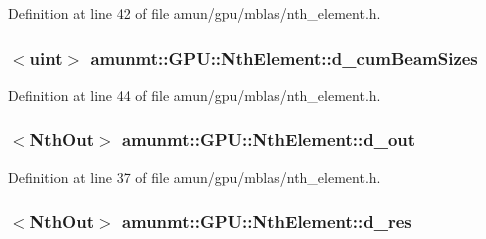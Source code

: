 Definition at line 42 of file amun/gpu/mblas/nth\+\_\+element.\+h.

\subsubsection[{\texorpdfstring{d\+\_\+cum\+Beam\+Sizes}{d_cumBeamSizes}}]{$<$uint$>$ amunmt\+::\+G\+P\+U\+::\+Nth\+Element\+::d\+\_\+cum\+Beam\+Sizes\hspace{0.3cm}{\ttfamily [private]}}\hypertarget{classamunmt_1_1GPU_1_1NthElement_adc21c425caa1181bf05b06b475dafc10}{}\label{classamunmt_1_1GPU_1_1NthElement_adc21c425caa1181bf05b06b475dafc10}


Definition at line 44 of file amun/gpu/mblas/nth\+\_\+element.\+h.

\subsubsection[{\texorpdfstring{d\+\_\+out}{d_out}}]{$<${\bf Nth\+Out}$>$ amunmt\+::\+G\+P\+U\+::\+Nth\+Element\+::d\+\_\+out\hspace{0.3cm}{\ttfamily [private]}}\hypertarget{classamunmt_1_1GPU_1_1NthElement_a548c267a24a0bb08c0e1404f686bb436}{}\label{classamunmt_1_1GPU_1_1NthElement_a548c267a24a0bb08c0e1404f686bb436}


Definition at line 37 of file amun/gpu/mblas/nth\+\_\+element.\+h.

\subsubsection[{\texorpdfstring{d\+\_\+res}{d_res}}]{$<${\bf Nth\+Out}$>$ amunmt\+::\+G\+P\+U\+::\+Nth\+Element\+::d\+\_\+res\hspace{0.3cm}{\ttfamily [private]}}\hypertarget{classamunmt_1_1GPU_1_1NthElement_a0a062223b34ac2de666f65bb66c1a8ba}{}\label{classamunmt_1_1GPU_1_1NthElement_a0a062223b34ac2de666f65bb66c1a8ba}


